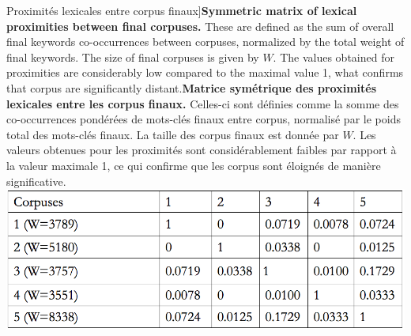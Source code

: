 \begin{table}
\caption[Lexical proximities between final corpuses][Proximités lexicales entre corpus finaux]{\textbf{Symmetric matrix of lexical proximities between final corpuses.} These are defined as the sum of overall final keywords co-occurrences between corpuses, normalized by the total weight of final keywords. The size of final corpuses is given by $W$. The values obtained for proximities are considerably low compared to the maximal value 1, what confirms that corpus are significantly distant.\label{tab:quantepistemo:lexical}}{\textbf{Matrice symétrique des proximités lexicales entre les corpus finaux.} Celles-ci sont définies comme la somme des co-occurrences pondérées de mots-clés finaux entre corpus, normalisé par le poids total des mots-clés finaux. La taille des corpus finaux est donnée par $W$. Les valeurs obtenues pour les proximités sont considérablement faibles par rapport à la valeur maximale 1, ce qui confirme que les corpus sont éloignés de manière significative.\label{tab:quantepistemo:lexical}}
\includegraphics[width=0.8\linewidth]{Figures/QuantEpistemo/corpusesDistances}
\end{table}









